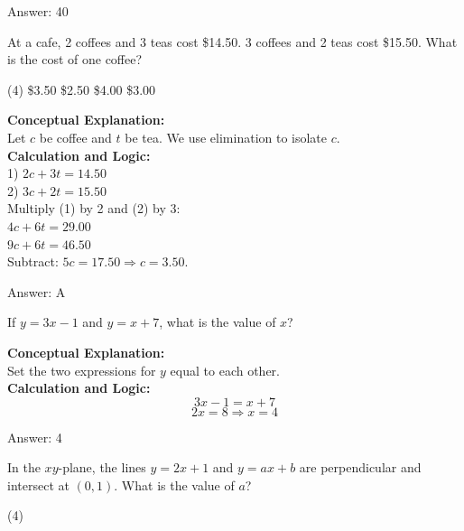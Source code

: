 \documentclass[11pt,paper=a4,answers]{exam}
\begin{document}
\begin{questions}
\begin{solution}
\vspace{15pt}
Answer: \colorbox{yellow!100}{40}
\end{solution}

\question
At a cafe, 2 coffees and 3 teas cost \$14.50. 3 coffees and 2 teas cost \$15.50. What is the cost of one coffee?
\begin{tasks}(4)
    \task \$3.50
    \task \$2.50
    \task \$4.00
    \task \$3.00
\end{tasks}

\begin{solution}
\textbf{Conceptual Explanation:} \\
Let $c$ be coffee and $t$ be tea. We use elimination to isolate $c$.
\\[10pt]
\textbf{Calculation and Logic:} \\
1) $2c + 3t = 14.50$ \\
2) $3c + 2t = 15.50$ \\
Multiply (1) by 2 and (2) by 3: \\
$4c + 6t = 29.00$ \\
$9c + 6t = 46.50$ \\
Subtract: $5c = 17.50 \Rightarrow c = 3.50$.

\vspace{15pt}
Answer: \colorbox{yellow!100}{A}
\end{solution}

\question
If $y = 3x - 1$ and $y = x + 7$, what is the value of $x$?

\begin{solution}
\textbf{Conceptual Explanation:} \\
Set the two expressions for $y$ equal to each other.
\\[10pt]
\textbf{Calculation and Logic:} \\
\[3x - 1 = x + 7\]
\[2x = 8 \Rightarrow x = 4\]

\vspace{15pt}
Answer: \colorbox{yellow!100}{4}
\end{solution}

\question
In the $xy$-plane, the lines $y = 2x + 1$ and $y = ax + b$ are perpendicular and intersect at $(0, 1)$. What is the value of $a$?
\begin{tasks}(4)
\end{tasks}


\end{questions}
\end{document}
